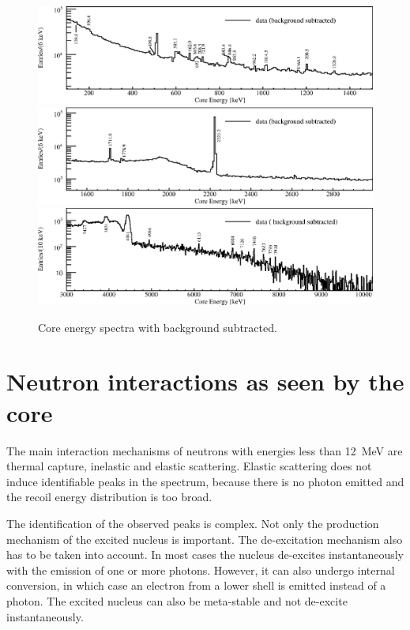 \begin{figure}[tbhp]
  \centering
  \includegraphics[width=\textwidth,clip]{spectra_0_1d5MeV}
  \includegraphics[width=\textwidth,clip]{spectra_1d5_3MeV}
  \includegraphics[width=\textwidth,clip]{spectra_3_10d2MeV}
  \caption{Core energy spectra with background subtracted.}
  \label{fig:neu:specd}
\end{figure}

\section{Neutron interactions as seen by the core}
\label{sec:neu:type}
The main interaction mechanisms of neutrons with energies less than 12~MeV are thermal capture, inelastic and elastic scattering. Elastic scattering does not induce identifiable peaks in the spectrum, because there is no photon emitted and the recoil energy distribution is too broad. 

The identification of the observed peaks is complex. Not only the production mechanism of the excited nucleus is important. The de-excitation mechanism also has to be taken into account. In most cases the nucleus de-excites instantaneously with the emission of one or more photons. However, it can also undergo internal conversion, in which case an electron from a lower shell is emitted instead of a photon. The excited nucleus can also be meta-stable and not de-excite instantaneously.

